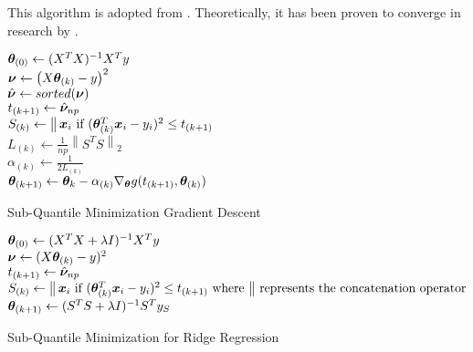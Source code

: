\documentclass{article} %
\newcommand{\norm}[1]{\left\lVert#1\right\rVert}
\DeclareMathOperator*{\concat}{%
	\mathchoice%
	{\Big\Vert}%
	{\big\Vert}%
	{\Vert}%
	{\Vert}%
}
\begin{document}
	This algorithm is adopted from \cite{Razaviyayn}. Theoretically, it has been proven to converge in research by \cite{Jin_2019}.\\
	\begin{minipage}{0.48\textwidth}
	\begin{algorithm}[H]
		\DontPrintSemicolon
		
		${\bm{\theta}}_{(0)} \gets (X^T X)^{-1}X^T y$\\
		{
			$\displaystyle {\bm{\nu}} \gets \left(X{\bm{\theta}}_{(k)} - y\right)^2$\\
			{
				$\hat{{\bm{\nu}}} \gets sorted({\bm{\nu}})$\\
				$\displaystyle t_{(k+1)} \gets \hat{{\bm{\nu}}}_{np}$\\
			}
			$S_{(k)} \gets \concat \vx_i\text{ if } (\vtheta_{(k)}^T \vx_i - y_i)^2 \leq t_{(k+1)}$\\
			$L_{(k)} \gets \frac{1}{np}\norm{S^T S}_2$\\
			$\alpha_{(k)} \gets \frac{1}{2L_{(k)}}$\\
			$\displaystyle {\bm{\theta}}_{(k+1)} \gets {\bm{\theta}}_k - \alpha_{(k)} \nabla_{\bm{\theta}} g(t_{(k+1)},{\bm{\theta}}_{(k)})$
		}
		\caption{Sub-Quantile Minimization Gradient Descent}
		\label{alg:sqo1}
	\end{algorithm}
	\end{minipage}
	\hfill
	\begin{minipage}{0.48\textwidth}
		\begin{algorithm}[H]
			${\bm{\theta}}_{(0)} \gets (X^T X + \lambda I)^{-1}X^T y$\\
			{
				${\bm{\nu}} \gets (X {\bm{\theta}}_{(k)} - y)^2$\\
				$t_{(k+1)} \gets \hat{{\bm{\nu}}}_{np}$\\
				$S_{(k)} \gets \concat \vx_i\text{ if } (\vtheta_{(k)}^T \vx_i - y_i)^2 \leq t_{(k+1)} \text{ where $\concat$ represents the concatenation operator}$\\
				${\bm{\theta}}_{(k+1)} \gets (S^T S + \lambda I)^{-1}S^T y_S$\\
			}
			\caption{Sub-Quantile Minimization for Ridge Regression}
			\label{alg:sqo-ridge}
		\end{algorithm}
	\end{minipage}
		
\end{document}

